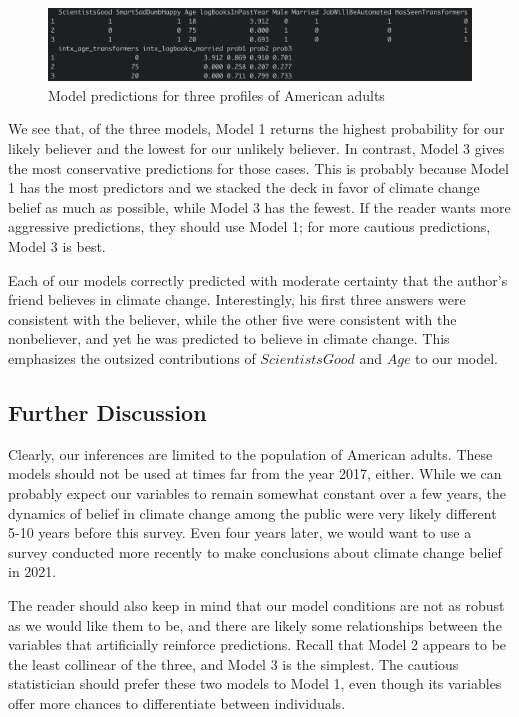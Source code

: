 \begin{figure}[h]
    \centering
    \includegraphics[scale=.5]{predictions.png}
    \caption{Model predictions for three profiles of American adults}
    \label{fig:predictions}
\end{figure}

\par We see that, of the three models, Model 1 returns the highest probability for our likely believer and the lowest for our unlikely believer. In contrast, Model 3 gives the most conservative predictions for those cases. This is probably because Model 1 has the most predictors and we stacked the deck in favor of climate change belief as much as possible, while Model 3 has the fewest. If the reader wants more aggressive predictions, they should use Model 1; for more cautious predictions, Model 3 is best.

\par \bigskip Each of our models correctly predicted with moderate certainty that the author's friend believes in climate change. Interestingly, his first three answers were consistent with the believer, while the other five were consistent with the nonbeliever, and yet he was predicted to believe in climate change. This emphasizes the outsized contributions of $ScientistsGood$ and $Age$ to our model.

\newpage

\subsection{Further Discussion}

\par Clearly, our inferences are limited to the population of American adults. These models should not be used at times far from the year 2017, either. While we can probably expect our variables to remain somewhat constant over a few years, the dynamics of belief in climate change among the public were very likely different 5-10 years before this survey. Even four years later, we would want to use a survey conducted more recently to make conclusions about climate change belief in 2021.

\par \bigskip The reader should also keep in mind that our model conditions are not as robust as we would like them to be, and there are likely some relationships between the variables that artificially reinforce predictions. Recall that Model 2 appears to be the least collinear of the three, and Model 3 is the simplest. The cautious statistician should prefer these two models to Model 1, even though its variables offer more chances to differentiate between individuals.


